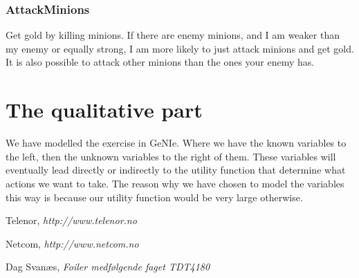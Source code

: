 \documentclass[titlepage]{article}
\begin{document}
\subsubsection*{AttackMinions}
Get gold by killing minions. If there are enemy minions, and I am weaker than my enemy or equally strong, I am more likely to just attack minions and get gold. It is also possible to attack other minions than the ones your enemy has. 




\newpage

\section{The qualitative part}
We have modelled the exercise in GeNIe. Where we have the known variables to the left, then the unknown variables to the right of them. These variables will eventually lead directly or indirectly to the utility function that determine what actions we want to take. The reason why we have chosen to model the variables this way is because our utility function would be very large otherwise.






%

\newpage
\begin{thebibliography}{9}

	Telenor,
	\emph{http://www.telenor.no}

	Netcom,
	\emph{http://www.netcom.no}

	Dag Svanæs,
	\emph{Foiler medfølgende faget TDT4180}
\end{thebibliography}
\end{document}
